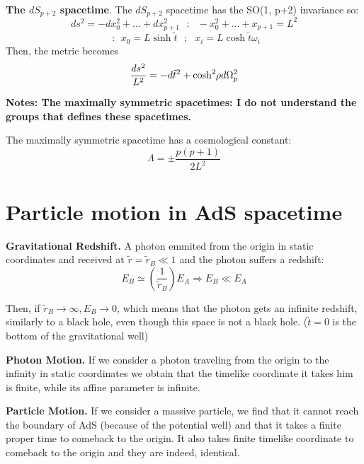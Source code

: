 \documentclass[12pt]{article}
\begin{document}
\newpage

\textbf{The \(dS_{p+2}\) spacetime}. The \(dS_{p+2}\) spacetime has the SO(1, p+2) invariance so:
\begin{equation}
    ds^2 = - dx_0^2 + ... + dx_{p+1}^2 ~~~:~~~ - x_0^2 + ... + x_{p+1} = L^2
\end{equation}
\begin{equation}
    ~~:~~ x_0 = L\sinh{ \tilde{t} } ~~~;~~~ x_i = L\cosh{ \tilde{t} } \omega_i
\end{equation}
Then, the metric becomes
\begin{equation}
    \frac{ds^2}{L^2} = -d\tilde{t}^2 + \cosh^2{ \hspace{-2pt}\rho }d\Omega_p^2
\end{equation}

\textbf{Notes: The maximally symmetric spacetimes: I do not understand the groups that defines these spacetimes.}

The maximally symmetric spacetime has a cosmological constant:
\[
    \Lambda = \pm\frac{p(p+1)}{2L^2}
\]

\section{Particle motion in AdS spacetime}

\textbf{Gravitational Redshift.} A photon emmited from the origin in static coordinates and received at \(\tilde{r} = \tilde{r}_B \ll 1\) and the photon suffers a redshift:
\begin{equation}
    E_B \simeq \left(\frac{1}{\tilde{r}_B}\right)E_A \Longrightarrow E_B \ll E_A
\end{equation}

Then, if \( \tilde{r}_B \rightarrow \infty, E_B \rightarrow 0 \), which means that the photon gets an infinite redshift, similarly to a black hole, even though this space is not a black hole. (\( \tilde{t} = 0\) is the bottom of the gravitational well)

\textbf{Photon Motion.} If we consider a photon traveling from the origin to the infinity in static coordinates we obtain that the timelike coordinate it takes him is finite, while its affine parameter is infinite.

\textbf{Particle Motion.} If we consider a massive particle, we find that it cannot reach the boundary of AdS (because of the potential well) and that it takes a finite proper time to comeback to the origin. It also takes finite timelike coordinate to comeback to the origin and they are indeed, identical. 
\end{document}
